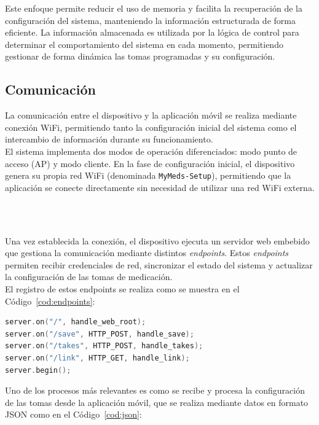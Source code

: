 Este enfoque permite reducir el uso de memoria y facilita la recuperación de la configuración del sistema, manteniendo la información estructurada de forma eficiente. La información almacenada es utilizada por la lógica de control para determinar el comportamiento del sistema en cada momento, permitiendo gestionar de forma dinámica las tomas programadas y su configuración.

\subsection{Comunicación}
\label{sec:comunicacion}

La comunicación entre el dispositivo y la aplicación móvil se realiza mediante conexión WiFi, permitiendo tanto la configuración inicial del sistema como el intercambio de información durante su funcionamiento.\\

El sistema implementa dos modos de operación diferenciados: modo punto de acceso (AP) y modo cliente. En la fase de configuración inicial, el dispositivo genera su propia red WiFi (denominada \texttt{MyMeds-Setup}), permitiendo que la aplicación se conecte directamente sin necesidad de utilizar una red WiFi externa.\\

\

\

Una vez establecida la conexión, el dispositivo ejecuta un servidor web embebido que gestiona la comunicación mediante distintos \textit{endpoints}. Estos \textit{endpoints} permiten recibir credenciales de red, sincronizar el estado del sistema y actualizar la configuración de las tomas de medicación.\\

El registro de estos endpoints se realiza como se muestra en el Código~\ref{cod:endpoints}:

\begin{code}[H]
\begin{lstlisting}[language=C++]
server.on("/", handle_web_root);
server.on("/save", HTTP_POST, handle_save);
server.on("/takes", HTTP_POST, handle_takes);
server.on("/link", HTTP_GET, handle_link);
server.begin();
\end{lstlisting}
\caption{Registro de \textit{endpoints} en el servidor web embebido}
\label{cod:endpoints}
\end{code}

Uno de los procesos más relevantes es como se recibe y procesa la configuración de las tomas desde la aplicación móvil, que se realiza mediante datos en formato JSON como en el Código~\ref{cod:json}:

